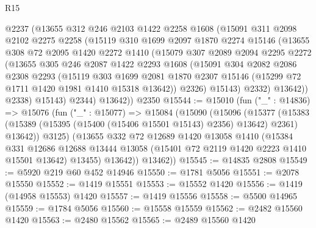 \begin{lexlean}{R15}
\begin{coremodule}
          @2237
          (@13655
            @312
            @246
            @2103
            @1422
            @2258
            @1608
            (@15091
              @311
              @2098
              @2102
              @2275
              @2258
              (@15119
                @310
                @1699
                @2097
                @1870
                @2274
                @15146
                (@13655
                  @308
                  @72
                  @2095
                  @1420
                  @2272
                  @1410
                  (@15079
                    @307
                    @2089
                    @2094
                    @2295
                    @2272
                    (@13655
                      @305
                      @246
                      @2087
                      @1422
                      @2293
                      @1608
                      (@15091
                        @304
                        @2082
                        @2086
                        @2308
                        @2293
                        (@15119
                          @303
                          @1699
                          @2081
                          @1870
                          @2307
                          @15146
                          (@15299 @72 @1711 @1420 @1981 @1410 @15318 @13642))
                        @2326)
                      @15143)
                    @2332)
                  @13642))
              @2338)
            @15143)
          @2344)
        @13642))
    @2350
@15544 := @15010
    (fun ("_" : @14836) =>
    @15076
      (fun ("_" : @15077) =>
      @15084
        (@15090
          (@15096
            (@15377
              (@15383 (@15389 (@15395 (@15400 (@15406 @15501 @15143) @2356) @13642) @2361) @13642))
            @3125)
          (@13655
            @332
            @72
            @12689
            @1420
            @13058
            @1410
            (@15384
              @331
              @12686
              @12688
              @13444
              @13058
              (@15401 @72 @2119 @1420 @2223 @1410 @15501 @13642)
              @13455)
            @13642))
        @13462))
@15545 := @14835 @2808
@15549 := @5920 @219 @60 @452 @14946
@15550 := @1781 @5056
@15551 := @2078 @15550
@15552 := @1419 @15551
@15553 := @15552 @1420
@15556 := @1419 (@14958 @15553) @1420
@15557 := @1419 @15556
@15558 := @5500 @14965
@15559 := @1784 @5056
@15560 := @15558 @15559
@15562 := @2482 @15560 @1420
@15563 := @2480 @15562
@15565 := @2489 @15560 @1420

\end{coremodule}
\end{lexlean}
